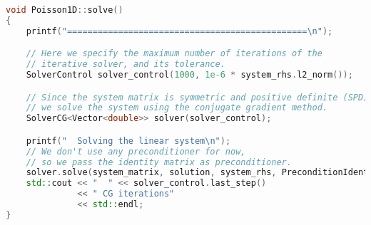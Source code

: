 \begin{lstlisting}[language=C++]
void Poisson1D::solve()
{
    printf("===============================================\n");

    // Here we specify the maximum number of iterations of the
    // iterative solver, and its tolerance.
    SolverControl solver_control(1000, 1e-6 * system_rhs.l2_norm());

    // Since the system matrix is symmetric and positive definite (SPD),
    // we solve the system using the conjugate gradient method.
    SolverCG<Vector<double>> solver(solver_control);

    printf("  Solving the linear system\n");
    // We don't use any preconditioner for now,
    // so we pass the identity matrix as preconditioner.
    solver.solve(system_matrix, solution, system_rhs, PreconditionIdentity());
    std::cout << "  " << solver_control.last_step()
              << " CG iterations"
              << std::endl;
}\end{lstlisting}
